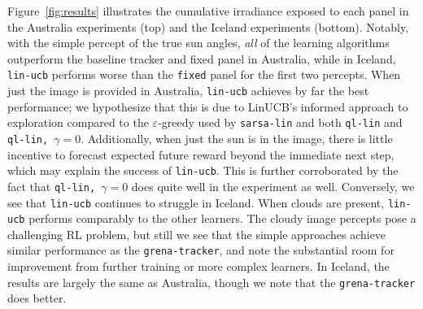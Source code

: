 \documentclass{article}
\begin{document}


Figure~\ref{fig:results} illustrates the cumulative irradiance exposed to each panel in the Australia experiments (top) and the Iceland experiments (bottom). Notably, with the simple percept of the true sun angles, {\it all} of the learning algorithms outperform the baseline tracker and fixed panel in Australia, while in Iceland, \texttt{lin-ucb} performs worse than the \texttt{fixed} panel for the first two percepts. When just the image is provided in Australia, \texttt{lin-ucb} achieves by far the best performance; we hypothesize that this is due to LinUCB's informed approach to exploration compared to the $\varepsilon$-greedy used by \texttt{sarsa-lin} and both \texttt{ql-lin} and \texttt{ql-lin, $\gamma=0$}. Additionally, when just the sun is in the image, there is little incentive to forecast expected future reward beyond the immediate next step, which may explain the success of \texttt{lin-ucb}. This is further corroborated by the fact that \texttt{ql-lin, $\gamma=0$} does quite well in the experiment as well. Conversely, we see that \texttt{lin-ucb} continues to struggle in Iceland. When clouds are present, \texttt{lin-ucb} performs comparably to the other learners. The cloudy image percepts pose a challenging RL problem, but still we see that the simple approaches achieve similar performance as the \texttt{grena-tracker}, and note the substantial room for improvement from further training or more complex learners. In Iceland, the results are largely the same as Australia, though we note that the \texttt{grena-tracker} does better. 
\end{document}
